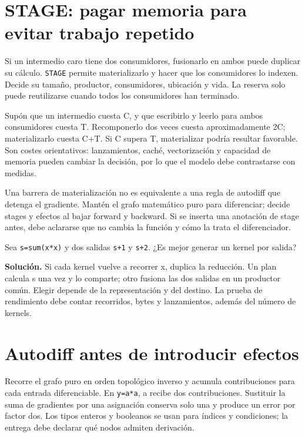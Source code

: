 \documentclass[12pt,a4paper,oneside]{report}
\begin{document}
\section{STAGE: pagar memoria para evitar trabajo repetido}
Si un intermedio caro tiene dos consumidores, fusionarlo en ambos puede duplicar su cálculo. \texttt{STAGE} permite materializarlo y hacer que los consumidores lo indexen. Decide su tamaño, productor, consumidores, ubicación y vida. La reserva solo puede reutilizarse cuando todos los consumidores han terminado.

Supón que un intermedio cuesta C, y que escribirlo y leerlo para ambos consumidores cuesta T. Recomponerlo dos veces cuesta aproximadamente 2C; materializarlo cuesta C+T. Si C supera T, materializar podría resultar favorable. Son costes orientativos: lanzamientos, caché, vectorización y capacidad de memoria pueden cambiar la decisión, por lo que el modelo debe contrastarse con medidas.

Una barrera de materialización no es equivalente a una regla de autodiff que detenga el gradiente. Mantén el grafo matemático puro para diferenciar; decide stages y efectos al bajar forward y backward. Si se inserta una anotación de stage antes, debe aclararse que no cambia la función y cómo la trata el diferenciador.

\begin{practica}
Sea \texttt{s=sum(x*x)} y dos salidas \texttt{s+1} y \texttt{s+2}. ¿Es mejor generar un kernel por salida?

\textbf{Solución.} Si cada kernel vuelve a recorrer x, duplica la reducción. Un plan calcula s una vez y lo comparte; otro fusiona las dos salidas en un productor común. Elegir depende de la representación y del destino. La prueba de rendimiento debe contar recorridos, bytes y lanzamientos, además del número de kernels.

\end{practica}
\section{Autodiff antes de introducir efectos}
Recorre el grafo puro en orden topológico inverso y acumula contribuciones para cada entrada diferenciable. En \texttt{y=a*a}, a recibe dos contribuciones. Sustituir la suma de gradientes por una asignación conserva solo una y produce un error por factor dos. Los tipos enteros y booleanos se usan para índices y condiciones; la entrega debe declarar qué nodos admiten derivación.
\end{document}
